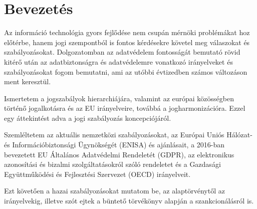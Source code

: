 \chapter{Bevezetés}

Az információ technológia gyors fejlődése nem csupán mérnöki problémákat hoz előtérbe, hanem jogi szempontból is fontos kérdésekre követel meg válaszokat és szabályozásokat. Dolgozatomban az adatvédelem fontosságát bemutató rövid kitérő után az adatbiztonságra és adatvédelemre vonatkozó irányelveket és szabályozásokat fogom bemutatni, ami az utóbbi évtizedben számos változáson ment keresztül.

Ismertetem a jogszabályok hierarchiájára, valamint az európai közösségben történő jogalkotásra és az EU irányelveire, továbbá a jogharmonizációra. Ezzel egy áttekintést adva a jogi szabályozás koncepciójáról.

Szemléltetem az aktuális nemzetközi szabályozásokat, az Európai Uniós Hálózat- és Információbiztonsági Ügynökségét (ENISA) és ajánlásait, a 2016-ban bevezetett EU Általános Adatvédelmi Rendeletét (GDPR), az elektronikus azonosítási és bizalmi szolgáltatásokról szóló rendeletet és a Gazdasági Együttműködési és Fejlesztési Szervezet (OECD) irányelveit.

Ezt követően a hazai szabályozásokat mutatom be, az alaptörvénytől az irányelvekig, illetve szót ejtek a büntető törvékönyv alapján a szankcionálásról is.
